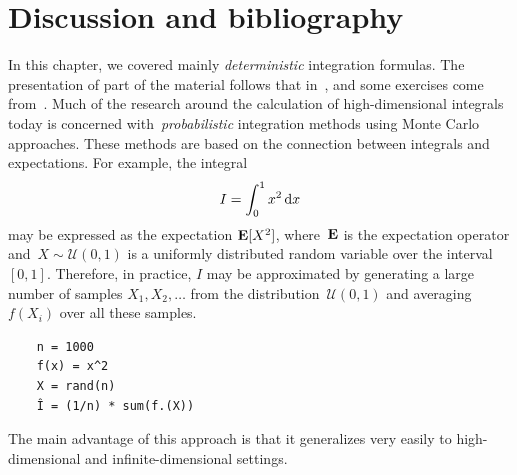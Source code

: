 \section{Discussion and bibliography}
In this chapter,
we covered mainly \emph{deterministic} integration formulas.
The presentation of part of the material follows that in~\cite{Legat},
and some exercises come from~\cite[Chapter 9]{MR2265914}.
Much of the research around the calculation of high-dimensional integrals today is concerned with~\emph{probabilistic} integration methods using Monte Carlo approaches.
These methods are based on the connection between integrals and expectations.
For example, the integral
\[
    I = \int_{0}^{1} x^2 \, \mathrm d x
\]
may be expressed as the expectation $\mathbf E [X^2]$,
where~$\mathbf E$ is the expectation operator and~$X \sim \mathcal U(0, 1)$ is a uniformly distributed random variable over the interval~$[0, 1]$.
Therefore, in practice, $I$ may be approximated by generating a large number of samples $X_1, X_2,\dotsc$ from the distribution~$\mathcal U(0, 1)$
and averaging $f(X_i)$ over all these samples.
\begin{verbatim}
    n = 1000
    f(x) = x^2
    X = rand(n)
    Î = (1/n) * sum(f.(X))
\end{verbatim}
The main advantage of this approach is that it generalizes very easily to high-dimensional and infinite-dimensional settings.
